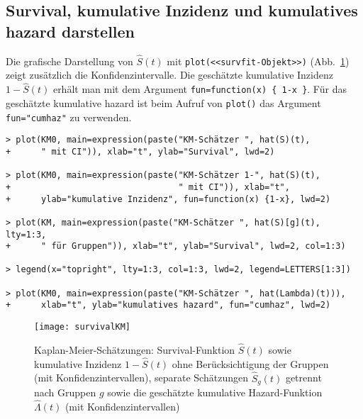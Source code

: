 \subsection{Survival, kumulative Inzidenz und kumulatives hazard darstellen}

Die grafische Darstellung von $\hat{S}(t)$ mit \lstinline!plot(<<survfit-Objekt>>)! (Abb.\ \ref{fig:survivalKM}) zeigt zusätzlich die Konfidenzintervalle. Die geschätzte kumulative Inzidenz $1-\hat{S}(t)$ erhält man mit dem Argument \lstinline!fun=function(x) { 1-x }!. Für das geschätzte kumulative hazard ist beim Aufruf von \lstinline!plot()! das Argument \lstinline!fun="cumhaz"! zu verwenden.
\begin{lstlisting}
> plot(KM0, main=expression(paste("KM-Schätzer ", hat(S)(t),
+      " mit CI")), xlab="t", ylab="Survival", lwd=2)

> plot(KM0, main=expression(paste("KM-Schätzer 1-", hat(S)(t),
+                                 " mit CI")), xlab="t",
+      ylab="kumulative Inzidenz", fun=function(x) {1-x}, lwd=2)

> plot(KM, main=expression(paste("KM-Schätzer ", hat(S)[g](t), lty=1:3,
+      " für Gruppen")), xlab="t", ylab="Survival", lwd=2, col=1:3)

> legend(x="topright", lty=1:3, col=1:3, lwd=2, legend=LETTERS[1:3])

> plot(KM0, main=expression(paste("KM-Schätzer ", hat(Lambda)(t))),
+      xlab="t", ylab="kumulatives hazard", fun="cumhaz", lwd=2)
\end{lstlisting}

\begin{figure}[!ht]
\centering
\texttt{[image: survivalKM]}
\vspace*{-1em}
\caption{Kaplan-Meier-Schätzungen: Survival-Funktion $\hat{S}(t)$ sowie kumulative Inzidenz $1-\hat{S}(t)$ ohne Berücksichtigung der Gruppen (mit Konfidenzintervallen), separate Schätzungen $\hat{S}_{g}(t)$ getrennt nach Gruppen $g$ sowie die geschätzte kumulative Hazard-Funktion $\hat{\Lambda}(t)$ (mit Konfidenzintervallen)}
\label{fig:survivalKM}
\end{figure}

